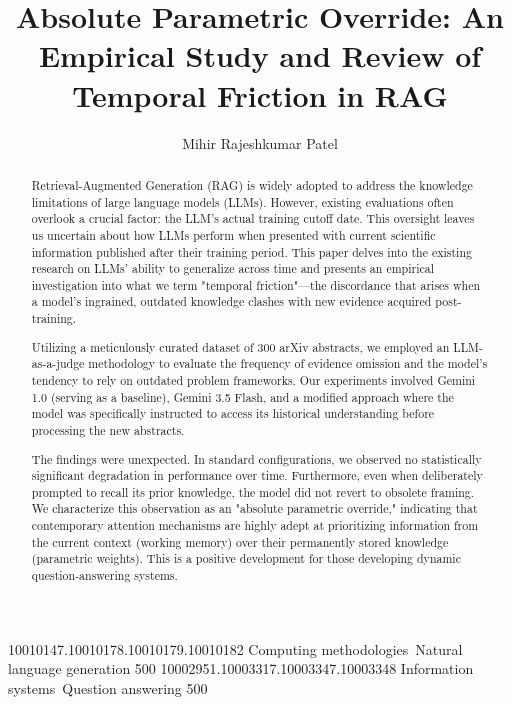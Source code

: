 \documentclass[acmsmall,screen,nonacm]{acmart}
\begin{document}
\title{Absolute Parametric Override: An Empirical Study and Review of Temporal Friction in RAG}

\author{Mihir Rajeshkumar Patel}

\begin{abstract}
Retrieval-Augmented Generation (RAG) is widely adopted to address the knowledge limitations of large language models (LLMs). However, existing evaluations often overlook a crucial factor: the LLM's actual training cutoff date. This oversight leaves us uncertain about how LLMs perform when presented with current scientific information published after their training period. This paper delves into the existing research on LLMs' ability to generalize across time and presents an empirical investigation into what we term "temporal friction"—the discordance that arises when a model's ingrained, outdated knowledge clashes with new evidence acquired post-training.

Utilizing a meticulously curated dataset of 300 arXiv abstracts, we employed an LLM-as-a-judge methodology to evaluate the frequency of evidence omission and the model's tendency to rely on outdated problem frameworks. Our experiments involved Gemini 1.0 (serving as a baseline), Gemini 3.5 Flash, and a modified approach where the model was specifically instructed to access its historical understanding before processing the new abstracts.

The findings were unexpected. In standard configurations, we observed no statistically significant degradation in performance over time. Furthermore, even when deliberately prompted to recall its prior knowledge, the model did not revert to obsolete framing. We characterize this observation as an "absolute parametric override," indicating that contemporary attention mechanisms are highly adept at prioritizing information from the current context (working memory) over their permanently stored knowledge (parametric weights). This is a positive development for those developing dynamic question-answering systems.
\end{abstract}


\begin{CCSXML}
10010147.10010178.10010179.10010182
Computing methodologies~Natural language generation
500
10002951.10003317.10003347.10003348
Information systems~Question answering
500
\end{CCSXML}
\end{document}

